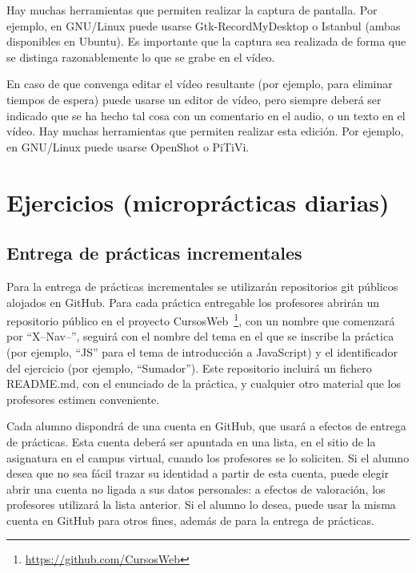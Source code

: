 Hay muchas herramientas que permiten realizar la captura de pantalla. Por ejemplo, en GNU/Linux puede usarse Gtk-RecordMyDesktop o Istanbul (ambas disponibles en Ubuntu). Es importante que la captura sea realizada de forma que se distinga razonablemente lo que se grabe en el vídeo.

En caso de que convenga editar el vídeo resultante (por ejemplo, para eliminar tiempos de espera) puede usarse un editor de vídeo, pero siempre deberá ser indicado que se ha hecho tal cosa con un comentario en el audio, o un texto en el vídeo. Hay muchas herramientas que permiten realizar esta edición. Por ejemplo, en GNU/Linux puede usarse OpenShot o PiTiVi.


\chapter{Ejercicios (microprácticas diarias)}

\section{Entrega de prácticas incrementales}
\label{sec:eje-entrega-practicas-incr}

Para la entrega de prácticas incrementales se utilizarán repositorios git públicos alojados en GitHub. Para cada práctica entregable los profesores abrirán un repositorio público en el proyecto CursosWeb~\footnote{\url{https://github.com/CursosWeb}}, con un nombre que comenzará por ``X--Nav--'', seguirá con el nombre del tema en el que se inscribe la práctica (por ejemplo, ``JS'' para el tema de introducción a JavaScript) y el identificador del ejercicio (por ejemplo, ``Sumador''). Este repositorio incluirá un fichero README.md, con el enunciado de la práctica, y cualquier otro material que los profesores estimen conveniente.

Cada alumno dispondrá de una cuenta en GitHub, que usará a efectos de entrega de prácticas. Esta cuenta deberá ser apuntada en una lista, en el sitio de la asignatura en el campus virtual, cuando los profesores se lo soliciten. Si el alumno desea que no sea fácil trazar su identidad a partir de esta cuenta, puede elegir abrir una cuenta no ligada a sus datos personales: a efectos de valoración, los profesores utilizará la lista anterior. Si el alumno lo desea, puede usar la misma cuenta en GitHub para otros fines, además de para la entrega de prácticas.

